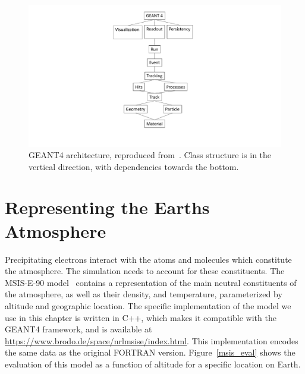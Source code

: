 \begin{figure}[p]
\label{GEANT4-structure}
\hspace{-6cm}
\includegraphics[width=1.7\textwidth]{figures/chapter_3/GEANT4-structure/GEANT4-structure}
\caption{GEANT4 architecture, reproduced from~\citet{Pfeier:519005}. Class structure is in the vertical direction, with dependencies towards the bottom.}
\end{figure}

\section{Representing the Earths Atmosphere}

Precipitating electrons interact with the atoms and molecules which constitute the atmosphere. The simulation needs to account for these constituents. The MSIS-E-90 model~\citep{Picone2002} contains a representation of the main neutral constituents of the atmosphere, as well as their density, and temperature, parameterized by altitude and geographic location. The specific implementation of the model we use in this chapter is written in C++, which makes it compatible with the GEANT4 framework, and is available at \url{https://www.brodo.de/space/nrlmsise/index.html}. This implementation encodes the same data as the original FORTRAN version. Figure~\ref{msis_eval} shows the evaluation of this model as a function of altitude for a specific location on Earth. 


